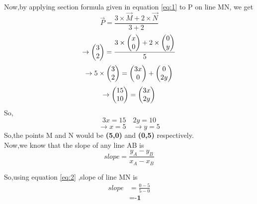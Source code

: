 \documentclass[journal,12pt,twocolumn]{IEEEtran}
\begin{document}
Now,by applying section formula given in equation \eqref{eq:1} to P on line MN, we get\\
\begin{equation*}
    \vec{P}=\frac{3\times \vec{M}+2\times \vec{N}}{3+2}
\end{equation*}
\begin{equation*}
    \rightarrow\begin{pmatrix}3 \\ 2\end{pmatrix}=\frac{3\times \begin{pmatrix}x\\0\end{pmatrix}+2\times \begin{pmatrix}0\\y\end{pmatrix}}{5}
\end{equation*}
\begin{equation*}
    \rightarrow5\times \begin{pmatrix}3\\2\end{pmatrix}=\begin{pmatrix}3x\\0\end{pmatrix}+\begin{pmatrix}0\\2y\end{pmatrix}
\end{equation*}
\begin{equation}
\rightarrow\begin{pmatrix}15\\10\end{pmatrix}=\begin{pmatrix}3x\\2y\end{pmatrix}  \nonumber
\end{equation}
So,
\begin{equation*}
3x=15\quad 2y=10
\end{equation*}
\begin{equation}
\rightarrow x=5\quad \rightarrow y=5       \nonumber
\end{equation}
So,the points M and N would be \textbf{(5,0)} and \textbf{(0,5)} respectively.\\

Now,we know that the slope of any line AB is
 \begin{equation}
 \label{eq:2}
 slope=\frac{y_A-y_B}{x_A-x_B}        
\end{equation}

So,using equation \eqref{eq:2} ,slope of line MN is
 \begin{align}
 slope&=\frac{0-5}{5-0}     \nonumber        \\
 &=\textbf{-1}                  \nonumber
 \end{align}
\end{document}

